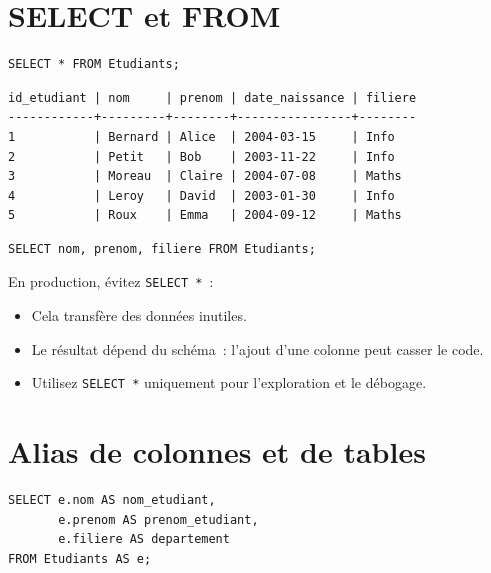 \section{SELECT et FROM}

\begin{codeblock}[title=\textbf{S\'electionner toutes les colonnes}]
\begin{verbatim}
SELECT * FROM Etudiants;
\end{verbatim}
\end{codeblock}

\begin{codeoutput}
\begin{verbatim}
id_etudiant | nom     | prenom | date_naissance | filiere
------------+---------+--------+----------------+--------
1           | Bernard | Alice  | 2004-03-15     | Info
2           | Petit   | Bob    | 2003-11-22     | Info
3           | Moreau  | Claire | 2004-07-08     | Maths
4           | Leroy   | David  | 2003-01-30     | Info
5           | Roux    | Emma   | 2004-09-12     | Maths
\end{verbatim}
\end{codeoutput}

\begin{codeblock}[title=\textbf{S\'electionner des colonnes sp\'ecifiques}]
\begin{verbatim}
SELECT nom, prenom, filiere FROM Etudiants;
\end{verbatim}
\end{codeblock}

\begin{bonnepratique}[title=\textbf{\'Eviter SELECT *}]
En production, \'evitez \texttt{SELECT *}~:
\begin{itemize}
    \item Cela transf\`ere des donn\'ees inutiles.
    \item Le r\'esultat d\'epend du sch\'ema~: l'ajout d'une colonne peut casser le code.
    \item Utilisez \texttt{SELECT *} uniquement pour l'exploration et le d\'ebogage.
\end{itemize}
\end{bonnepratique}

\section{Alias de colonnes et de tables}

\begin{codeblock}[title=\textbf{Utilisation d'alias}]
\begin{verbatim}
SELECT e.nom AS nom_etudiant,
       e.prenom AS prenom_etudiant,
       e.filiere AS departement
FROM Etudiants AS e;
\end{verbatim}
\end{codeblock}

